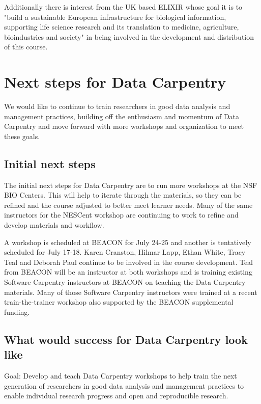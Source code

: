 \documentclass[11pt]{article}
\begin{document}
Additionally there is interest from the UK based ELIXIR whose goal it is to "build a sustainable European infrastructure for biological information, supporting life science research and its translation to medicine, agriculture, bioindustries and society" in being involved in the development and distribution of this course. 

\section{Next steps for Data Carpentry}

We would like to continue to train researchers in good data analysis and management practices, building off the enthusiasm and momentum of Data Carpentry and move forward with more workshops and organization to meet 
these goals.

\subsection{Initial next steps}

The initial next steps for Data Carpentry are to run more workshops at the NSF BIO Centers. This will help to 
iterate through the materials, so they can be refined and the course adjusted to better meet learner needs. Many of the same instructors for the NESCent workshop are continuing to work to refine and develop materials and workflow.

A workshop is scheduled at BEACON for July 24-25 and another is tentatively scheduled for July 17-18. Karen Cranston, Hilmar Lapp, Ethan White, Tracy Teal and Deborah Paul continue to be involved in the course development. Teal from BEACON will be an instructor at both workshops and is training existing Software Carpentry instructors at BEACON on teaching the Data Carpentry materials. Many of those Software Carpentry instructors were trained at a recent train-the-trainer workshop also supported by the BEACON supplemental funding. 

\subsection{What would success for Data Carpentry look like}

\hangindent=0.7cm Goal: Develop and teach Data Carpentry workshops to help train the next generation of researchers in good data analysis and management practices to enable individual research progress and open and reproducible research. 
\end{document}
